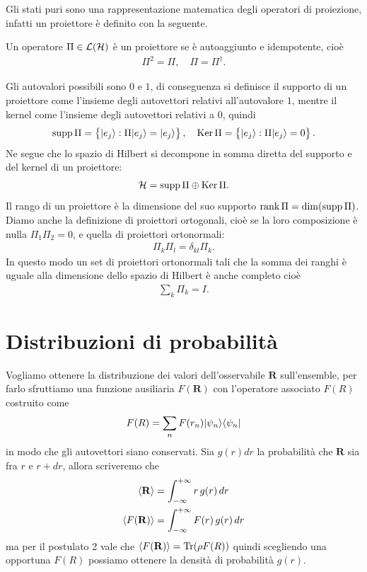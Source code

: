 Gli stati puri sono una rappresentazione matematica degli operatori di proiezione, infatti un proiettore è definito con la seguente.
\begin{definition}[ Proiettore ]
  Un operatore $ \Pi\in \operatorname{\mathcal{L}}(\operatorname{\mathcal{H}})$ è un proiettore se è autoaggiunto e idempotente, cioè 
  \begin{align*}
    \Pi^2 = \Pi, \quad \Pi = \Pi^\dag.
  \end{align*}
\end{definition}
Gli autovalori possibili sono $ 0 $ e $ 1 $, di conseguenza si definisce il supporto di un proiettore 
come l'insieme degli autovettori relativi all'autovalore $ 1 $, mentre il kernel come l'insieme degli autovettori relativi a $ 0 $, quindi 
\begin{align*}
  \supp \Pi = \left\{ \phb \k{e_j} : \Pi \k{e_j} = \k{e_j}\right\}, \quad \Ker \Pi = \left\{ \phb \k{e_j} : \Pi \k{e_j} = 0 \right\}.
\end{align*}
Ne segue che lo spazio di Hilbert si decompone in somma diretta del supporto e del kernel di un proiettore: 
\begin{align*}
  \operatorname{\mathcal{H}} = \operatorname{\textnormal{supp}} \Pi \oplus \operatorname{\textnormal{Ker}} \Pi.
\end{align*}
Il rango di un proiettore è la dimensione del suo supporto $ \operatorname{\textnormal{rank}} \Pi = \dim (\operatorname{\textnormal{supp}} \Pi) $. Diamo anche la definizione di proiettori ortogonali, cioè 
se la loro composizione è nulla $ \Pi_1 \Pi_2 = 0 $, e quella di proiettori ortonormali:
\begin{align*}
  \Pi_k \Pi_l = \delta_{kl} \Pi_k.
\end{align*}
In questo modo un set di proiettori ortonormali tali che la somma dei ranghi è uguale alla dimensione dello spazio di Hilbert è anche completo cioè 
\begin{align*}
  \sum_{k} \Pi_k = I.
\end{align*}



\section{Distribuzioni di probabilità}

Vogliamo ottenere la distribuzione dei valori dell'osservabile $ \mathbf{R} $ sull'ensemble, per farlo sfruttiamo una funzione ausiliaria $ F(\mathbf{R}) $ 
con l'operatore associato $ F(R) $ costruito come
\begin{align*}
  F(R) = \sum_{n} F(r_n) \vert \psi_n \rangle \langle \psi_n \vert
\end{align*}
in modo che gli autovettori siano conservati. Sia $ g(r)dr $ la probabilità che $ \mathbf{R} $ sia fra $ r $ e $ r + dr $, allora scriveremo che 
\begin{align*}
  \left< \mathbf{R} \right> &= \int_{-\infty}^{+\infty} r \, g(r) \,dr
  \\
  \left< F(\mathbf{R}) \right> &= \int_{-\infty}^{+\infty} F(r) \,g(r) \,dr
\end{align*}
ma per il postulato 2 vale che $ \left< F(\mathbf{R}) \right> = \operatorname{\textnormal{Tr}}(\rho F(R)) $ quindi scegliendo una opportuna $ F(R) $ possiamo ottenere la densità di 
probabilità $ g(r) $. 

